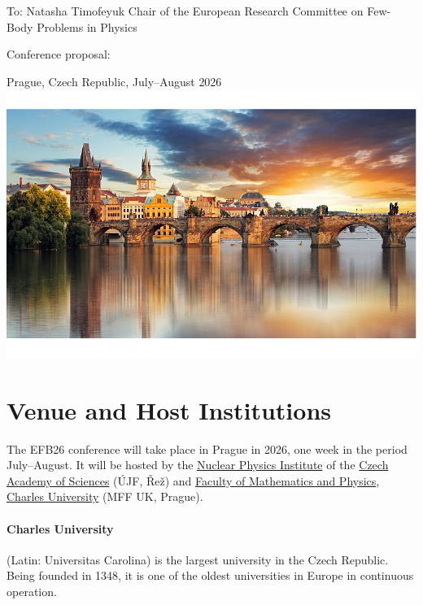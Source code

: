 \documentclass[12pt]{extarticle}
\begin{document}
\color{C0}


\noindent
To: Natasha Timofeyuk \newline
Chair of the European Research Committee \newline
on Few-Body Problems in Physics

\bigskip
\noindent
\doublespacing
  \noindent
  {\Large Conference proposal:}

  \bigskip
\doublespacing
{} \newline
{\Large Prague, Czech Republic, July--August 2026}\\
\includegraphics[width=1.0\textwidth]{Prague_foto_cut}

\onehalfspacing
\section*{Venue and Host Institutions}
\noindent
The EFB26 conference will take place in Prague in 2026, one week in
the period July--August. It will be hosted by the
\href{http://www.ujf.cas.cz/en/}{Nuclear Physics Institute} of the
\href{https://www.avcr.cz/en/}{Czech Academy of Sciences} (ÚJF, Řež)
and \href{https://www.mff.cuni.cz/en}{Faculty of Mathematics and
  Physics}, \href{https://cuni.cz/UKEN-1.html}{Charles University}
(MFF UK, Prague).

\paragraph{Charles University} (Latin: Universitas Carolina) is the
largest university in the Czech Republic. Being founded in 1348, it is
one of the oldest universities in Europe in continuous operation.
\end{document}
